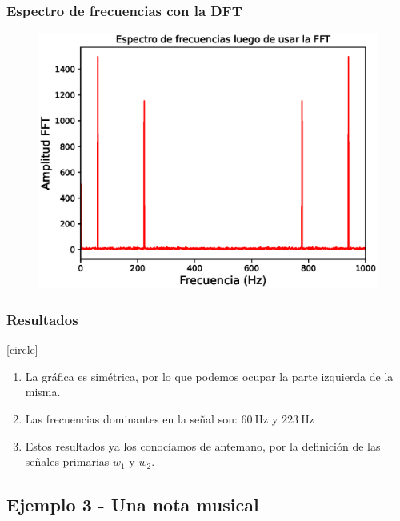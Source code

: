 \documentclass[12pt]{beamer}
\begin{document}
\begin{frame}
\frametitle{Espectro de frecuencias con la DFT}
\begin{figure}
    \centering
    \includegraphics[scale=0.6]{Imagenes/DFT_Analisis_Senal_04.eps}
\end{figure}
\end{frame}
\begin{frame}
\frametitle{Resultados}
[circle]
\begin{enumerate}[<+->]
\item La gráfica es simétrica, por lo que podemos ocupar la parte izquierda de la misma.
\item Las frecuencias dominantes en la señal son: $\SI{60}{\hertz}$ y $\SI{223}{\hertz}$
\item Estos resultados ya los conocíamos de antemano, por la definición de las señales primarias $w_{1}$ y $w_{2}$.
\end{enumerate}
\end{frame}

\subsection{Ejemplo 3 - Una nota musical}
\end{document}
